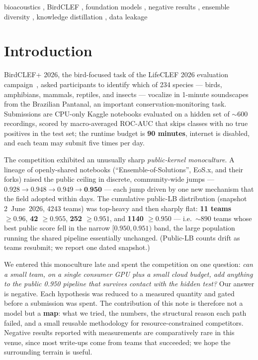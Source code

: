 \documentclass{ceurart}
\begin{document}
\begin{keywords}
  bioacoustics \sep
  BirdCLEF \sep
  foundation models \sep
  negative results \sep
  ensemble diversity \sep
  knowledge distillation \sep
  data leakage
\end{keywords}

\maketitle

\section{Introduction}
\label{sec:intro}

BirdCLEF+ 2026, the bird-focused task of the LifeCLEF 2026 evaluation
campaign~\cite{lifeclef2026,birdclef2026overview}, asked participants to identify
which of 234 species --- birds, amphibians, mammals, reptiles, and insects ---
vocalize in 1-minute soundscapes from the Brazilian Pantanal, an important
conservation-monitoring task. Submissions are CPU-only Kaggle notebooks evaluated
on a hidden set of ${\sim}600$ recordings, scored by macro-averaged ROC-AUC that
skips classes with no true positives in the test set; the runtime budget is
\textbf{90 minutes}, internet is disabled, and each team may submit five times per
day.

The competition exhibited an unusually sharp \emph{public-kernel monoculture}. A
lineage of openly-shared notebooks (``Ensemble-of-Solutions'', EoS.x, and their
forks) raised the public ceiling in discrete, community-wide jumps ---
$0.928 \to 0.948 \to 0.949 \to \textbf{0.950}$ --- each jump driven by one new
mechanism that the field adopted within days. The cumulative public-LB
distribution (snapshot 2~June~2026, 4243 teams) was top-heavy and then sharply
flat: \textbf{11 teams $\geq 0.96$}, \textbf{42 $\geq 0.955$},
\textbf{252 $\geq 0.951$}, and \textbf{1140 $\geq 0.950$} --- i.e.\ ${\sim}890$
teams whose best public score fell in the narrow $[0.950, 0.951)$ band, the large
population running the shared pipeline essentially unchanged. (Public-LB counts
drift as teams resubmit; we report one dated snapshot.)

We entered this monoculture late and spent the competition on one question:
\emph{can a small team, on a single consumer GPU plus a small cloud budget, add
anything to the public 0.950 pipeline that survives contact with the hidden test?}
Our answer is negative. Each hypothesis was reduced to a measured quantity and
gated before a submission was spent. The contribution of this note is therefore
not a model but a \textbf{map}: what we tried, the numbers, the structural reason
each path failed, and a small reusable methodology for resource-constrained
competitors. Negative results reported with measurements are comparatively rare
in this venue, since most write-ups come from teams that succeeded; we hope the
surrounding terrain is useful.
\end{document}
